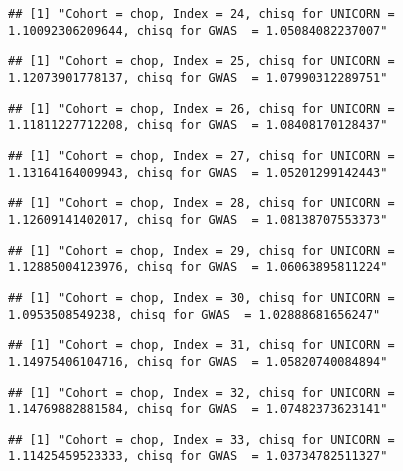 \documentclass[]{article}
\begin{document}
\begin{verbatim}
## [1] "Cohort = chop, Index = 24, chisq for UNICORN = 1.10092306209644, chisq for GWAS  = 1.05084082237007"
\end{verbatim}

\begin{verbatim}
## [1] "Cohort = chop, Index = 25, chisq for UNICORN = 1.12073901778137, chisq for GWAS  = 1.07990312289751"
\end{verbatim}

\begin{verbatim}
## [1] "Cohort = chop, Index = 26, chisq for UNICORN = 1.11811227712208, chisq for GWAS  = 1.08408170128437"
\end{verbatim}

\begin{verbatim}
## [1] "Cohort = chop, Index = 27, chisq for UNICORN = 1.13164164009943, chisq for GWAS  = 1.05201299142443"
\end{verbatim}

\begin{verbatim}
## [1] "Cohort = chop, Index = 28, chisq for UNICORN = 1.12609141402017, chisq for GWAS  = 1.08138707553373"
\end{verbatim}

\begin{verbatim}
## [1] "Cohort = chop, Index = 29, chisq for UNICORN = 1.12885004123976, chisq for GWAS  = 1.06063895811224"
\end{verbatim}

\begin{verbatim}
## [1] "Cohort = chop, Index = 30, chisq for UNICORN = 1.0953508549238, chisq for GWAS  = 1.02888681656247"
\end{verbatim}

\begin{verbatim}
## [1] "Cohort = chop, Index = 31, chisq for UNICORN = 1.14975406104716, chisq for GWAS  = 1.05820740084894"
\end{verbatim}

\begin{verbatim}
## [1] "Cohort = chop, Index = 32, chisq for UNICORN = 1.14769882881584, chisq for GWAS  = 1.07482373623141"
\end{verbatim}

\begin{verbatim}
## [1] "Cohort = chop, Index = 33, chisq for UNICORN = 1.11425459523333, chisq for GWAS  = 1.03734782511327"
\end{verbatim}
\end{document}
